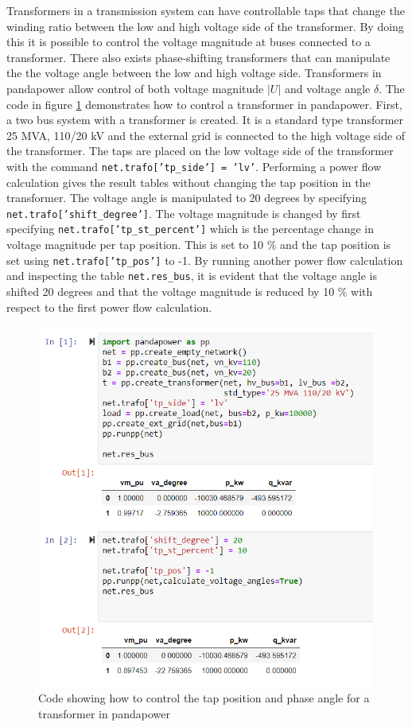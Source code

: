 \documentclass[class=book, crop=false, 11pt]{standalone}
\begin{document}
Transformers in a transmission system can have controllable taps that change the winding ratio between the low and high voltage side of the transformer. By doing this it is possible to control the voltage magnitude at buses connected to a transformer. There also exists phase-shifting transformers that can manipulate the the voltage angle between the low and high voltage side. Transformers in pandapower allow control of both voltage magnitude $|U|$ and voltage angle $\delta$. The code in figure \ref{fig:method:control_transformer} demonstrates how to control a transformer in pandapower. First, a two bus system with a transformer is created. It is a standard type transformer 25 MVA, 110/20 kV and the external grid is connected to the high voltage side of the transformer. The taps are placed on the low voltage side of the transformer with the command \texttt{net.trafo['tp\_side'] = 'lv'}. Performing a power flow calculation gives the result tables without changing the tap position in the transformer. The voltage angle is manipulated to 20 degrees by specifying \texttt{net.trafo['shift\_degree']}. The voltage magnitude is changed by first specifying \texttt{net.trafo['tp\_st\_percent']} which is the percentage change in voltage magnitude per tap position. This is set to 10 \% and the tap position is set using \texttt{net.trafo['tp\_pos']} to -1. By running another power flow calculation and inspecting the table \texttt{net.res\_bus}, it is evident that the voltage angle is shifted 20 degrees and that the voltage magnitude is reduced by 10 \% with respect to the first power flow calculation. 


\begin{figure}[H]
    \center
    \includegraphics[height=12cm, width=12cm]{figures/control_transformer.PNG}
    \caption {Code showing how to control the tap position and phase angle for a transformer in pandapower}
    \label{fig:method:control_transformer}
\end{figure}
\end{document}
